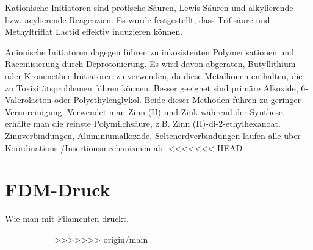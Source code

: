 \documentclass[10pt]{article}
\begin{document}
    Kationische Initiatoren sind protische Säuren, Lewis-Säuren und alkylierende bzw. acylierende Reagenzien.
    Es wurde festgestellt, dass Triflsäure und Methyltriflat Lactid effektiv induzieren können.

    Anionische Initiatoren dagegen führen zu inkosistenten Polymerisationen und Racemisierung durch Deprotonierung.
    Es wird davon abgeraten, Butyllithium oder Kronenether-Initiatoren zu verwenden, da diese Metallionen enthalten, die zu Toxizitätsproblemen führen können.
    Besser geeignet sind primäre Alkoxide, 6-Valerolacton oder Polyethylenglykol.
    Beide dieser Methoden führen zu geringer Verunreinigung.
    Verwendet man Zinn (II) und Zink während der Synthese, erhälte man die reinste Polymilchsäure, z.B. Zinn (II)-di-2-ethylhexanoat.
    Zinnverbindungen, Aluminiumalkoxide, Seltenerdverbindungen laufen alle über Koordinations-/Insertionsmechanismen ab.
<<<<<<< HEAD

    \section{FDM-Druck}
    Wie man mit Filamenten druckt.


=======
>>>>>>> origin/main
\end{document}
